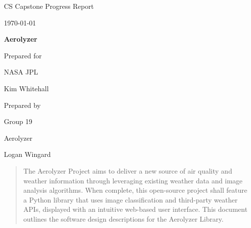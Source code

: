\documentclass[onecolumn, draftclsnofoot,10pt, compsoc]{IEEEtran}
\def \CapstoneTeamName{		Aerolyzer}
\def \CapstoneTeamNumber{		19}
\def \GroupMemberOne{			Logan Wingard}
\def \CapstoneProjectName{		Aerolyzer}
\def \CapstoneSponsorCompany{	NASA JPL}
\def \CapstoneSponsorPerson{		Kim Whitehall}
\def \DocType{		%
	Progress Report
}
\newcommand{\NameSigPair}[1]{\par
	\makebox[2.75in][r]{#1} \hfil 	\makebox[3.25in]{\makebox[2.25in]{\hrulefill} \hfill		\makebox[.75in]{\hrulefill}}
	\par\vspace{-12pt} \textit{\tiny\noindent
		\makebox[2.75in]{} \hfil		\makebox[3.25in]{\makebox[2.25in][r]{Signature} \hfill	\makebox[.75in][r]{Date}}}}
\renewcommand{\NameSigPair}[1]{#1}
\begin{document}
	\begin{titlepage}
		\begin{singlespace}

			\centering
			\hfill 
			\par\vspace{.2in}
			\centering
			\scshape{
				\huge CS Capstone \DocType \par
				{\large\today}\par
				\vspace{.5in}
				\textbf{\Huge\CapstoneProjectName}\par
				\vfill
				{\large Prepared for}\par
				\Huge \CapstoneSponsorCompany\par
				\vspace{5pt}
				{\Large\NameSigPair{\CapstoneSponsorPerson}\par}
				{\large Prepared by }\par
				Group\CapstoneTeamNumber\par
				\CapstoneTeamName\par 
				\vspace{5pt}
				{\large
					\NameSigPair{\GroupMemberOne}\par
				}
				\vspace{20pt}
			}
			\begin{abstract}  
				The Aerolyzer Project aims to deliver a new source of air quality and weather information through leveraging existing weather data and image analysis algorithms.
				When complete, this open-source project shall feature a Python library that uses image classification and third-party weather APIs, displayed with an intuitive web-based user interface.
				This document outlines the software design descriptions for the Aerolyzer Library.
		
			\end{abstract}     
		\end{singlespace}
	\end{titlepage}

\tableofcontents


\clearpage
\end{document}
